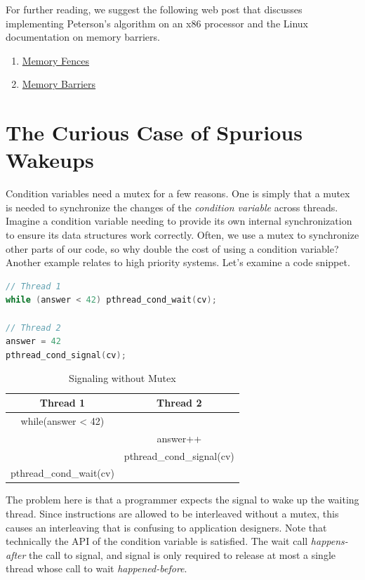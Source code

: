 For further reading, we suggest the following web post that discusses implementing Peterson's algorithm on an x86 processor and the Linux documentation on memory barriers.
\begin{enumerate}
\item \href{http://bartoszmilewski.com/2008/11/05/who-ordered-memory-fences-on-an-x86/}{Memory Fences}
\item \href{https://www.kernel.org/doc/Documentation/memory-barriers.txt}{Memory Barriers}
\end{enumerate}


\section{The Curious Case of Spurious Wakeups}

Condition variables need a mutex for a few reasons.
One is simply that a mutex is needed to synchronize the changes of the \textit{condition variable} across threads.
Imagine a condition variable needing to provide its own internal synchronization to ensure its data structures work correctly.
Often, we use a mutex to synchronize other parts of our code, so why double the cost of using a condition variable?
Another example relates to high priority systems.
Let's examine a code snippet.

\begin{lstlisting}[language=C]
// Thread 1
while (answer < 42) pthread_cond_wait(cv);

// Thread 2
answer = 42
pthread_cond_signal(cv);
\end{lstlisting}

\begin{center}
\begin{table}[h]
\caption{Signaling without Mutex}
\begin{tabular}{|c|c|}
  Thread 1 & Thread 2 \\ \hline
  while(answer < 42) & \\
  & answer++ \\
  & pthread\_cond\_signal(cv) \\
  pthread\_cond\_wait(cv)
\end{tabular}
\end{table}
\end{center}
The problem here is that a programmer expects the signal to wake up the waiting thread.
Since instructions are allowed to be interleaved without a mutex, this causes an interleaving that is confusing to application designers.
Note that technically the API of the condition variable is satisfied.
The wait call \textit{happens-after} the call to signal, and signal is only required to release at most a single thread whose call to wait \textit{happened-before}.

